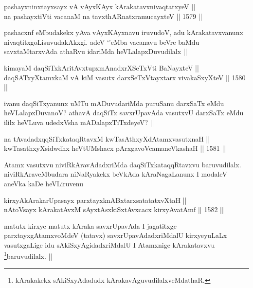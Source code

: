 
\begin{shl}
pashayxninxtayxsayx vA vAyxKAyx kArakatavxnivaqtatxyeV || \\
na pashayxtiVti vacanaM na tavxthARnatxramucayxteV ||  1579 ||  
\end{shl}

\begin{artha}
pashacxnf eMbudakekx yAva vAyxKAyxnavu iruvudoV, adu kArakatavxvanunx nivaqtitxgoLisuvudakAkxgi. adeV `\stext'eMba vacanavu beVre baMdu savxtaMtarxvAda athaRvu idariMda heVLalapxDuvudilalx ||
\end{artha}


\begin{shl}
kimayaM daqSiTxkAritAvxtupxmAnadxrXSeTxVti BaNayxteV || \\
daqSATxyXtamxkaM vA kiM vasutx darxSeTxVtayxtarx vivakaSxyXteV ||  1580 ||  
\end{shl}

\begin{artha}
ivanu daqSiTxyanunx uMTu mADuvudariMda puruSanu darxSaTx eMdu heVLalapxDuvanoV? athavA daqSiTx savxrUpavAda vasutxvU darxSaTx eMdu ililx heVLuva udedxVsha mADalapxTiTxdeyeV? ||
\end{artha}


\begin{shl}
na tAvadadxqqSiTxkataqRtavxM kwTasAthxyXdAtamxvasutxnaH || \\
kwTasathxyXsidwdhx heVtUMshacx pArxgavoVcamaneVkashaH ||  1581 ||  
\end{shl}

\begin{artha}
Atamx vasutxvu niviRkAravAdadxriMda daqSiTxkataqqRtavxvu baruvudilalx. niviRkAraveMbudara niNaRyakekx beVkAda kAraNagaLanunx I modaleV aneVka kaDe heVLiruvenu
\end{artha}

\begin{shl}
kirxyAkArakarUpasayx parxtayxknABxtarxsatatatxvXtaH ||  \\
nAtoV\s sayx kArakatAvxM sAyxtAsxkiSxtAvxcacx kirxyAvatAmf ||  1582 ||  
\end{shl}

\begin{artha}
matutx kirxye matutx kAraka savxrUpavAda I jagatitxge parxtayxgAtamxvoMdeV (tatavx) savxrUpavAdadxriMdalU kirxyeyuLaLx vasutxgaLige idu sAkiSxyAgidadxriMdalU I Atamxnige kArakatavxvu \footnote{kArakakekx sAkiSxyAdadudx kArakavAguvudilalxveMdathaR.}baruvudilalx. ||
\end{artha}


